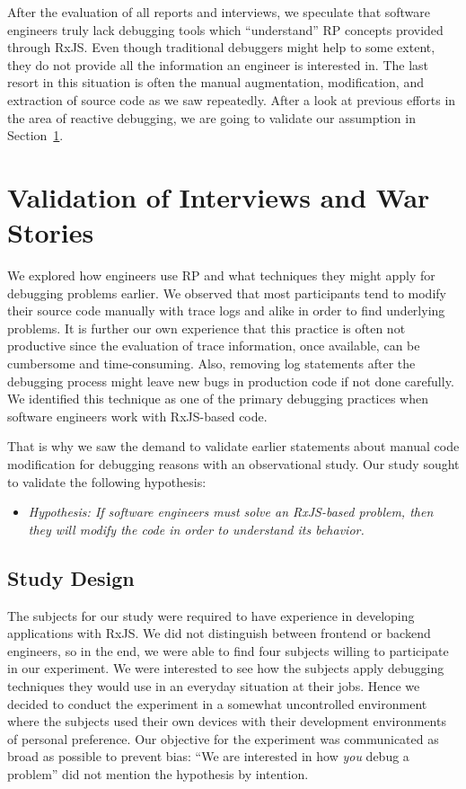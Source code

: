 \documentclass[12pt,a4paper]{article}
\begin{document}
After the evaluation of all reports and interviews, we speculate that software engineers truly lack debugging tools which ``understand'' RP concepts provided through RxJS. Even though traditional debuggers might help to some extent, they do not provide all the information an engineer is interested in. The last resort in this situation is often the manual augmentation, modification, and extraction of source code as we saw repeatedly. After a look at previous efforts in the area of reactive debugging, we are going to validate our assumption in Section~\ref{sec:study}.


\section{Validation of Interviews and War Stories}
\label{sec:study}

We explored how engineers use RP and what techniques they might apply for debugging problems earlier. We observed that most participants tend to modify their source code manually with trace logs and alike in order to find underlying problems. It is further our own experience that this practice is often not productive since the evaluation of trace information, once available, can be cumbersome and time-consuming. Also, removing log statements after the debugging process might leave new bugs in production code if not done carefully. We identified this technique as one of the primary debugging practices when software engineers work with RxJS-based code.

That is why we saw the demand to validate earlier statements about manual code modification for debugging reasons with an observational study. Our study sought to validate the following hypothesis:

\begin{itemize}
	\item \emph{Hypothesis: If software engineers must solve an RxJS-based problem, then they will modify the code in order to understand its behavior.}
\end{itemize}

\subsection{Study Design}

The subjects for our study were required to have experience in developing applications with RxJS. We did not distinguish between frontend or backend engineers, so in the end, we were able to find four subjects willing to participate in our experiment. We were interested to see how the subjects apply debugging techniques they would use in an everyday situation at their jobs. Hence we decided to conduct the experiment in a somewhat uncontrolled environment where the subjects used their own devices with their development environments of personal preference. Our objective for the experiment was communicated as broad as possible to prevent bias: ``We are interested in how \emph{you} debug a problem'' did not mention the hypothesis by intention.
\end{document}
